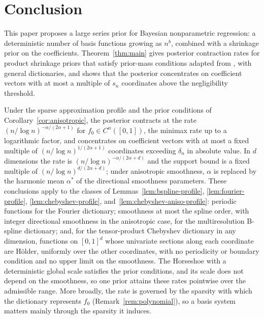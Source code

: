 \section{Conclusion}\label{sec-conc}

This paper proposes a large series prior for Bayesian nonparametric regression: a deterministic number of basis functions growing as $n^b$, combined with a shrinkage prior on the coefficients. Theorem~\ref{thm:main} gives posterior contraction rates for product shrinkage priors that satisfy prior-mass conditions adapted from \citet{WeiGhosal2020}, with general dictionaries, and shows that the posterior concentrates on coefficient vectors with at most a multiple of $s_n$ coordinates above the negligibility threshold.

Under the sparse approximation profile and the prior conditions of Corollary~\ref{cor:anisotropic}, the posterior contracts at the rate $(n/\log n)^{-\alpha/(2\alpha+1)}$ for $f_0\in C^\alpha([0,1])$, the minimax rate up to a logarithmic factor, and concentrates on coefficient vectors with at most a fixed multiple of $(n/\log n)^{1/(2\alpha+1)}$ coordinates exceeding $\delta_n$ in absolute value. In $d$ dimensions the rate is $(n/\log n)^{-\alpha/(2\alpha+d)}$ and the support bound is a fixed multiple of $(n/\log n)^{d/(2\alpha+d)}$; under anisotropic smoothness, $\alpha$ is replaced by the harmonic mean $\alpha^*$ of the directional smoothness parameters. These conclusions apply to the classes of Lemmas~\ref{lem:bspline-profile}, \ref{lem:fourier-profile}, \ref{lem:chebyshev-profile}, and~\ref{lem:chebyshev-aniso-profile}: periodic functions for the Fourier dictionary; smoothness at most the spline order, with integer directional smoothness in the anisotropic case, for the multiresolution B-spline dictionary; and, for the tensor-product Chebyshev dictionary in any dimension, functions on $[0,1]^d$ whose univariate sections along each coordinate are H\"older, uniformly over the other coordinates, with no periodicity or boundary condition and no upper limit on the smoothness. The Horseshoe with a deterministic global scale satisfies the prior conditions, and its scale does not depend on the smoothness, so one prior attains these rates pointwise over the admissible range. More broadly, the rate is governed by the sparsity with which the dictionary represents $f_0$ (Remark~\ref{rem:polynomial}), so a basis system matters mainly through the sparsity it induces.


